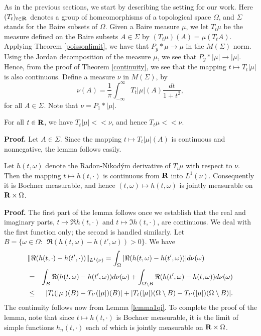 

As in the previous sections, we start by 
describing the setting for our work.
Here $(T_t)_{t\in\R}$ 
denotes a group of homeomorphisms of a topological
space $\Omega$, and $\Sigma$ stands for the Baire 
subsets of $\Omega$.  
Given 
a Baire measure $\mu$, we let $T_t\mu$ be the 
measure defined on the Baire subsets $A\in \Sigma$ 
by $(T_t\mu)(A)=\mu(T_t A)$.   
Applying
Theorem \ref{poissonlimit}, we have that $P_y*\mu\rightarrow \mu$ 
in the $M(\Sigma)$ norm.  Using the 
Jordan decomposition of the measure $\mu$, 
we see that $P_y*|\mu |\rightarrow |\mu |$.    
Hence, from the proof of Theorem \ref{continuity}, we see 
that the mapping $t\mapsto T_t|\mu |$ is also continuous.  
Define a measure $\nu$ in $M(\Sigma)$, by
\begin{equation}
\nu(A)=\frac{1}{\pi} \int^\infty_{-\infty} T_t|\mu| 
(A) \frac{dt}{1+t^2},
\label{poissonintegral}
\end{equation}
for all $A\in \Sigma$.  Note that $\nu=P_1 *|\mu|$.
\begin{lemma1qi}
For all $t\in \R$, we have $T_t|\mu|<<\nu$, and hence $T_t\mu<<\nu$.
\label{lemma1qi}
\end{lemma1qi}
{\bf Proof.}  Let $A\in \Sigma$.  Since the mapping 
$t\mapsto T_t|\mu |(A)$ is continuous and nonnegative, the 
lemma follows easily.

\begin{lemma2qi}
Let $h(t,\omega)$ denote the Radon-Nikod\'ym 
derivative of $T_t\mu$ with respect to $\nu$.  Then 
the mapping $t\mapsto h(t,\cdot)$ is 
continuous from $\R$ into $L^1(\nu)$.  
Consequently it is Bochner measurable, and 
hence $(t,\omega)\mapsto h(t,\omega)$ is jointly 
measurable on $\R\times\Omega$.
\label{lemma2qi}
\end{lemma2qi}
{\bf Proof.}  The first part of the lemma follows once 
we establish that the real and imaginary parts, 
$t\mapsto \Re h(t,\cdot)$ 
and $t\mapsto \Im h(t,\cdot)$, are continuous.  We deal 
with the first function only; the second is 
handled similarly.  Let 
$B=\{\omega\in \Omega:\ \ \Re ( h(t,\omega)-h(t',\omega))>0\}$. 
We have 
\begin{eqnarray*}
\lefteqn{
\|\Re (h(t,\cdot)-h(t',\cdot))\|_{L^1(\nu)}     =     
	\int_\Omega  | \Re (h(t,\omega)-h(t',\omega))|d\nu(\omega)}\\
					&=&
 \int_B \Re (h(t,\omega)-h(t',\omega))d\nu(\omega)+\int_{\Omega\setminus B} 
	\Re (h(t',\omega)-h(t,\omega))d\nu(\omega)\\
					&\leq&
	|T_t(|\mu |) (B)-T_{t'}(|\mu |) (B)|+ 
	|T_t (|\mu |) (\Omega\setminus B)-T_{t'}(|\mu |)
	(\Omega\setminus B)|.
\end{eqnarray*}
The continuity follows now from Lemma \ref{lemma1qi}.  
To complete the proof of the lemma, note that since 
$t\mapsto h(t,\cdot)$ is Bochner measurable, it 
is the limit of simple functions $h_n(t,\cdot)$ 
each of which is jointly measurable on $\R\times \Omega$.  

